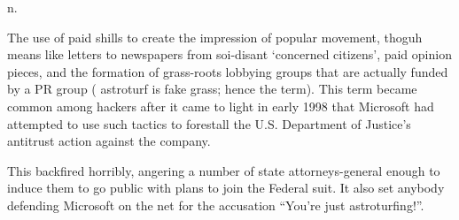  n.

The use of paid shills to create the impression of popular movement, thoguh means like letters to newspapers from soi-disant `concerned
citizens', paid opinion pieces, and the formation of grass-roots lobbying groups that are actually funded by a PR group ( astroturf is fake
grass; hence the term). This term became common among hackers after it came to light in early 1998 that Microsoft had attempted to use such
tactics to forestall the U.S. Department of Justice's antitrust action against the company.

This backfired horribly, angering a number of state attorneys-general enough to induce them to go public with plans to join the Federal
suit. It also set anybody defending Microsoft on the net for the accusation ``You're just astroturfing!''.

